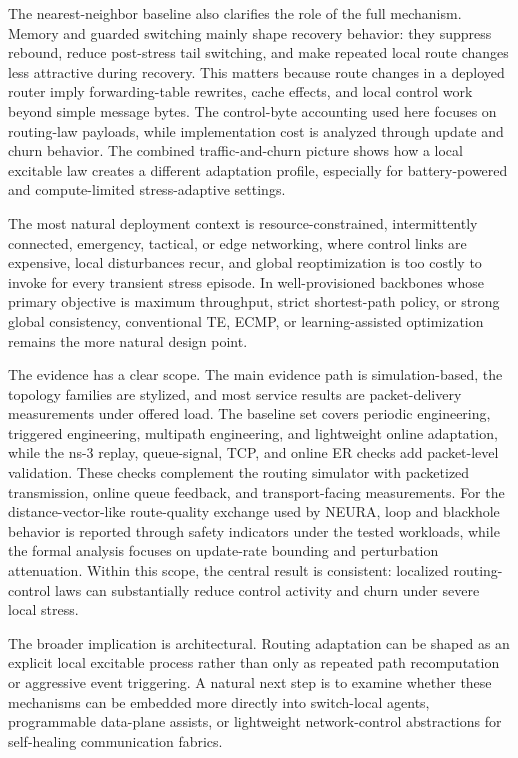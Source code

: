 \documentclass[5p,times]{elsarticle}
\begin{document}
The nearest-neighbor baseline also clarifies the role of the full mechanism. Memory and guarded switching mainly shape recovery behavior: they suppress rebound, reduce post-stress tail switching, and make repeated local route changes less attractive during recovery. This matters because route changes in a deployed router imply forwarding-table rewrites, cache effects, and local control work beyond simple message bytes. The control-byte accounting used here focuses on routing-law payloads, while implementation cost is analyzed through update and churn behavior. The combined traffic-and-churn picture shows how a local excitable law creates a different adaptation profile, especially for battery-powered and compute-limited stress-adaptive settings.

The most natural deployment context is resource-constrained, intermittently connected, emergency, tactical, or edge networking, where control links are expensive, local disturbances recur, and global reoptimization is too costly to invoke for every transient stress episode. In well-provisioned backbones whose primary objective is maximum throughput, strict shortest-path policy, or strong global consistency, conventional TE, ECMP, or learning-assisted optimization remains the more natural design point.

The evidence has a clear scope. The main evidence path is simulation-based, the topology families are stylized, and most service results are packet-delivery measurements under offered load. The baseline set covers periodic engineering, triggered engineering, multipath engineering, and lightweight online adaptation, while the ns-3 replay, queue-signal, TCP, and online ER checks add packet-level validation. These checks complement the routing simulator with packetized transmission, online queue feedback, and transport-facing measurements. For the distance-vector-like route-quality exchange used by NEURA, loop and blackhole behavior is reported through safety indicators under the tested workloads, while the formal analysis focuses on update-rate bounding and perturbation attenuation. Within this scope, the central result is consistent: localized routing-control laws can substantially reduce control activity and churn under severe local stress.

The broader implication is architectural. Routing adaptation can be shaped as an explicit local excitable process rather than only as repeated path recomputation or aggressive event triggering. A natural next step is to examine whether these mechanisms can be embedded more directly into switch-local agents, programmable data-plane assists, or lightweight network-control abstractions for self-healing communication fabrics.
\end{document}
